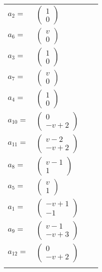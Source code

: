 \documentclass[1p]{elsarticle_modified}
\theoremstyle{definition}
\begin{document}
\begin{tabular}{m{7pt} m{180pt} m{7pt} m{180pt} }
\flushright $a_{2}=$&$\begin{pmatrix}1\\0\end{pmatrix}$ \\
\flushright $a_{6}=$&$\begin{pmatrix}v\\0\end{pmatrix}$ \\
\flushright $a_{3}=$&$\begin{pmatrix}1\\0\end{pmatrix}$ \\
\flushright $a_{7}=$&$\begin{pmatrix}v\\0\end{pmatrix}$ \\
\flushright $a_{4}=$&$\begin{pmatrix}1\\0\end{pmatrix}$ \\
\flushright $a_{10}=$&$\begin{pmatrix}0\\- v+2\end{pmatrix}$ \\
\flushright $a_{11}=$&$\begin{pmatrix}v-2\\- v+2\end{pmatrix}$ \\
\flushright $a_{8}=$&$\begin{pmatrix}v-1\\1\end{pmatrix}$ \\
\flushright $a_{5}=$&$\begin{pmatrix}v\\1\end{pmatrix}$ \\
\flushright $a_{1}=$&$\begin{pmatrix}- v+1\\-1\end{pmatrix}$ \\
\flushright $a_{9}=$&$\begin{pmatrix}v-1\\- v+3\end{pmatrix}$ \\
\flushright $a_{12}=$&$\begin{pmatrix}0\\- v+2\end{pmatrix}$\\&\end{tabular}
\end{document}
